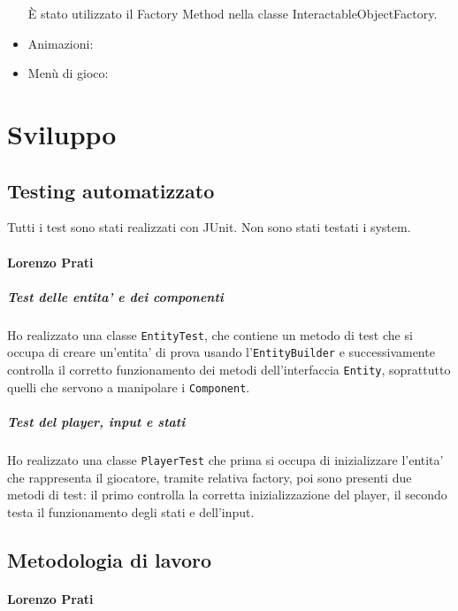 \documentclass[a4paper,12pt]{report}
\begin{document}
\begin{itemize}
	È stato utilizzato il Factory Method nella classe InteractableObjectFactory.
	\item Animazioni:
	\item Menù di gioco:
\end{itemize}







\chapter{Sviluppo}

\section{Testing automatizzato}

Tutti i test sono stati realizzati con JUnit. Non sono stati testati i system.

\subsubsection*{Lorenzo Prati}

\paragraph*{Test delle entita' e dei componenti}
Ho realizzato una classe \texttt{EntityTest}, che contiene un metodo di test che si occupa di creare un'entita' di prova usando l'\texttt{EntityBuilder} e successivamente controlla il corretto funzionamento dei metodi dell'interfaccia \texttt{Entity}, soprattutto quelli che servono a manipolare i \texttt{Component}.

\paragraph*{Test del player, input e stati}
Ho realizzato una classe \texttt{PlayerTest} che prima si occupa di inizializzare l'entita' che rappresenta il giocatore, tramite relativa factory, poi sono presenti due metodi di test: il primo controlla la corretta inizializzazione del player, il secondo testa il funzionamento degli stati e dell'input. 

\section{Metodologia di lavoro}

\subsubsection*{Lorenzo Prati}
\end{document}

